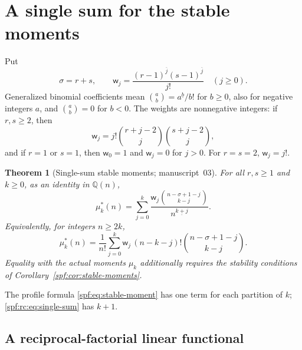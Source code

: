 \documentclass[11pt]{article}
\numberwithin{equation}{section}
\newtheorem{theorem}{Theorem}[section]
\theoremstyle{definition}
\theoremstyle{remark}
\theoremstyle{definition}
\newcommand{\Q}{\mathbb Q}
\newcommand{\fall}[2]{{#1}^{\underline{#2}}}
\newcommand{\rise}[2]{{#1}^{\overline{#2}}}
\newcommand{\rcw}{\mathsf w}
\begin{document}
\section{A single sum for the stable moments}
\label{spf:rc:sec:single-sum}

Put
\begin{equation}
 \sigma=r+s,\qquad
 \rcw_j=\frac{\rise{(r-1)}j\rise{(s-1)}j}{j!}\quad(j\ge0).
 \label{spf:rc:eq:weights}
\end{equation}
Generalized binomial coefficients mean $\binom ab=\fall ab/b!$ for $b\ge0$,
also for negative integers $a$, and $\binom ab=0$ for $b<0$. The weights are
nonnegative integers: if $r,s\ge2$, then
\begin{equation}
 \rcw_j=j!\binom{r+j-2}j\binom{s+j-2}j,
 \label{spf:rc:eq:integer-weights}
\end{equation}
and if $r=1$ or $s=1$, then $\rcw_0=1$ and $\rcw_j=0$ for $j>0$. For
$r=s=2$, $\rcw_j=j!$.

\begin{theorem}[Single-sum stable moments; manuscript~03]
\label{spf:rc:thm:single-sum}
For all $r,s\ge1$ and $k\ge0$, as an identity in $\Q(n)$,
\begin{equation}
 \boxed{\displaystyle
 \mu_k^*(n)=\sum_{j=0}^k
  \frac{\rcw_j\binom{n-\sigma+1-j}{k-j}}{\fall n{k+j}}.}
 \label{spf:rc:eq:single-sum}
\end{equation}
Equivalently, for integers $n\ge2k$,
\begin{equation}
 \mu_k^*(n)=\frac1{n!}\sum_{j=0}^k
          \rcw_j\,(n-k-j)!\binom{n-\sigma+1-j}{k-j}.
 \label{spf:rc:eq:single-sum-factorials}
\end{equation}
Equality with the actual moments $\mu_k$ additionally requires the
stability conditions of Corollary~\ref{spf:cor:stable-moments}.
\end{theorem}

The profile formula \eqref{spf:eq:stable-moment} has one term for each
partition of $k$; \eqref{spf:rc:eq:single-sum} has $k+1$.

\subsection{A reciprocal-factorial linear functional}
\end{document}
